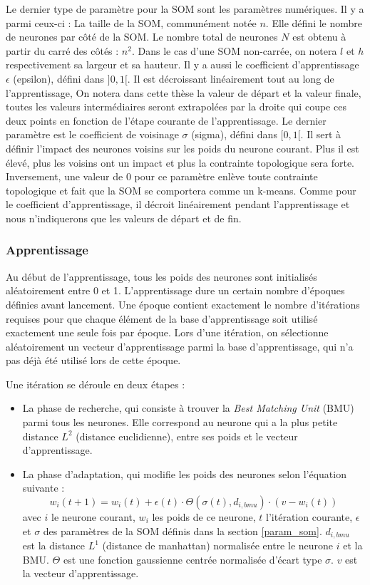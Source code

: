 	Le dernier type de paramètre pour la SOM sont les paramètres numériques. Il y a parmi ceux-ci : La taille de la SOM, communément notée $n$. Elle défini le nombre de neurones par côté de la SOM. Le nombre total de neurones $N$ est obtenu à partir du carré des côtés : $n^2$. Dans le cas d'une SOM non-carrée, on notera $l$ et $h$ respectivement sa largeur et sa hauteur. Il y a aussi le coefficient d'apprentissage $\epsilon$ (epsilon), défini dans $]0,1[$. Il est décroissant linéairement tout au long de l'apprentissage, On notera dans cette thèse la valeur de départ et la valeur finale, toutes les valeurs intermédiaires seront extrapolées par la droite qui coupe ces deux points en fonction de l'étape courante de l'apprentissage. Le dernier paramètre est le coefficient de voisinage $\sigma$ (sigma), défini dans $[0,1[$. Il sert à définir l'impact des neurones voisins sur les poids du neurone courant. Plus il est élevé, plus les voisins ont un impact et plus la contrainte topologique sera forte. Inversement, une valeur de 0 pour ce paramètre enlève toute contrainte topologique et fait que la SOM se comportera comme un k-means. Comme pour le coefficient d'apprentissage, il décroit linéairement pendant l'apprentissage et nous n'indiquerons que les valeurs de départ et de fin.

\subsubsection{Apprentissage}

	Au début de l'apprentissage, tous les poids des neurones sont initialisés aléatoirement entre 0 et 1. L'apprentissage dure un certain nombre d'époques définies avant lancement. Une époque contient exactement le nombre d'itérations requises pour que chaque élément de la base d'apprentissage soit utilisé exactement une seule fois par époque. Lors d'une itération, on sélectionne aléatoirement un vecteur d'apprentissage parmi la base d'apprentissage, qui n'a pas déjà été utilisé lors de cette époque. 

	Une itération se déroule en deux étapes : 
	\begin{itemize}
		\item La phase de recherche, qui consiste à trouver la \textit{Best Matching Unit} (BMU) parmi tous les neurones. Elle correspond au neurone qui a la plus petite distance $L^2$ (distance euclidienne), entre ses poids et le vecteur d'apprentissage.
		\item La phase d'adaptation, qui modifie les poids des neurones selon l'équation suivante :
		\begin{equation}\label{eq:SOM}
			w_i(t+1) = w_i(t)+\epsilon(t)\cdot\Theta(\sigma(t),d_{i,bmu})\cdot(v-w_i(t))
		\end{equation} avec $i$ le neurone courant, $w_i$ les poids de ce neurone, $t$ l'itération courante, $\epsilon$ et $\sigma$ des paramètres de la SOM définis dans la section \ref{param_som}. $d_{i, bmu}$ est la distance $L^1$ (distance de manhattan) normalisée entre le neurone $i$ et la BMU. $\Theta$ est une fonction gaussienne centrée normalisée d'écart type $\sigma$. $v$ est la vecteur d'apprentissage.
	\end{itemize}

